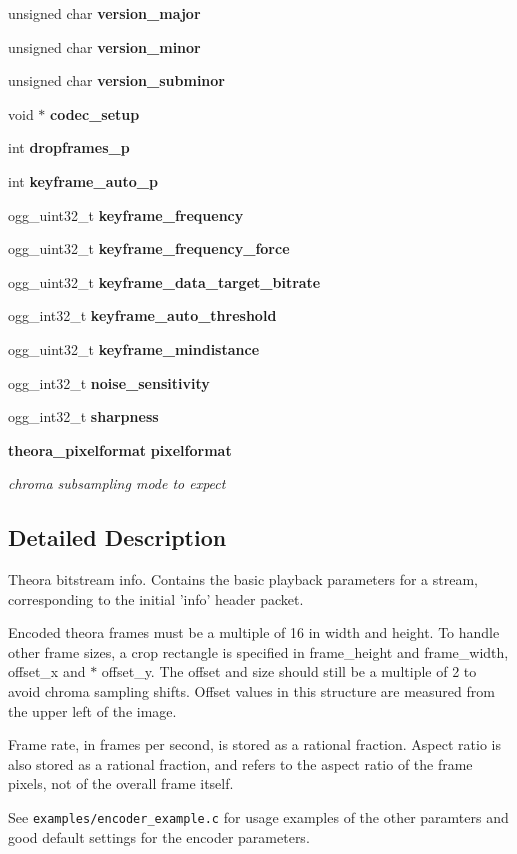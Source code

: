 \begin{DoxyCompactItemize}
unsigned char {\bf version\_\-major}
\item 
unsigned char {\bf version\_\-minor}
\item 
unsigned char {\bf version\_\-subminor}
\item 
void $\ast$ {\bf codec\_\-setup}
\item 
int {\bf dropframes\_\-p}
\item 
int {\bf keyframe\_\-auto\_\-p}
\item 
ogg\_\-uint32\_\-t {\bf keyframe\_\-frequency}
\item 
ogg\_\-uint32\_\-t {\bf keyframe\_\-frequency\_\-force}
\item 
ogg\_\-uint32\_\-t {\bf keyframe\_\-data\_\-target\_\-bitrate}
\item 
ogg\_\-int32\_\-t {\bf keyframe\_\-auto\_\-threshold}
\item 
ogg\_\-uint32\_\-t {\bf keyframe\_\-mindistance}
\item 
ogg\_\-int32\_\-t {\bf noise\_\-sensitivity}
\item 
ogg\_\-int32\_\-t {\bf sharpness}
\item 
{\bf theora\_\-pixelformat} {\bf pixelformat}
\begin{DoxyCompactList}\small\item\em chroma subsampling mode to expect \item\end{DoxyCompactList}\end{DoxyCompactItemize}


\subsection{Detailed Description}
Theora bitstream info. Contains the basic playback parameters for a stream, corresponding to the initial 'info' header packet.

Encoded theora frames must be a multiple of 16 in width and height. To handle other frame sizes, a crop rectangle is specified in frame\_\-height and frame\_\-width, offset\_\-x and $\ast$ offset\_\-y. The offset and size should still be a multiple of 2 to avoid chroma sampling shifts. Offset values in this structure are measured from the upper left of the image.

Frame rate, in frames per second, is stored as a rational fraction. Aspect ratio is also stored as a rational fraction, and refers to the aspect ratio of the frame pixels, not of the overall frame itself.

See {\tt examples/encoder\_\-example.c} for usage examples of the other paramters and good default settings for the encoder parameters. 

